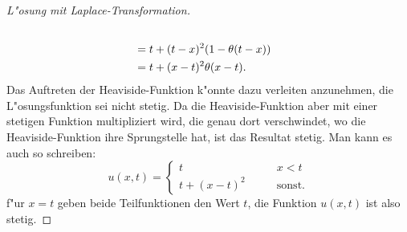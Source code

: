 \begin{proof}[L"osung mit Laplace-Transformation]
\begin{align}
\notag
\\
&=
t+(t-x)^2(1- \theta(t-x))
\notag
\\
&=t+(x-t)^2\theta(x-t).
\label{50000009:laplaceloesung}
\end{align}
Das Auftreten der Heaviside-Funktion k"onnte dazu verleiten anzunehmen,
die L"osungsfunktion sei nicht stetig. Da die Heaviside-Funktion
aber mit einer stetigen Funktion multipliziert wird, die genau dort
verschwindet, wo die Heaviside-Funktion ihre Sprungstelle hat, 
ist das Resultat stetig. Man kann es auch so schreiben:
\[
u(x,t)=\begin{cases}
t&\qquad x<t\\
t+(x-t)^2&\qquad\text{sonst}.
\end{cases}
\]
f"ur $x=t$ geben beide Teilfunktionen den Wert $t$, die Funktion $u(x,t)$
ist also stetig.
\end{proof}


